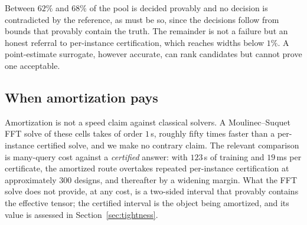 Between $62\%$ and $68\%$ of the pool is decided provably and no decision
is contradicted by the reference, as must be so, since the decisions
follow from bounds that provably contain the truth. The remainder is not a
failure but an honest referral to per-instance certification, which reaches
widths below $1\%$. A point-estimate surrogate, however accurate, can rank
candidates but cannot prove one acceptable.

\subsection{When amortization pays}
\label{sec:amortized:crossover}

Amortization is not a speed claim against classical solvers. A
Moulinec--Suquet FFT solve of these cells takes of order $1$\,s, roughly
fifty times faster than a per-instance certified solve, and we make no
contrary claim. The relevant comparison is many-query cost against a
\emph{certified} answer: with $123$\,s of training and $19$\,ms per
certificate, the amortized route overtakes repeated per-instance
certification at approximately $300$ designs, and thereafter by a widening
margin. What the FFT solve does not provide, at any cost, is a two-sided
interval that provably contains the effective tensor; the certified
interval is the object being amortized, and its value is assessed in
Section~\ref{sec:tightness}.

